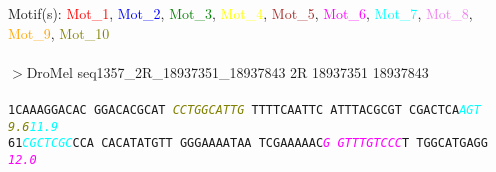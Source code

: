 \documentclass[11pt,twoside,reqno,a4paper]{article}
\begin{document}
\noindent
\newlength{\charwidth}Motif(s): \textcolor{red}{Mot\_1}, \textcolor{blue}{Mot\_2}, \textcolor{green}{Mot\_3}, \textcolor{yellow}{Mot\_4}, \textcolor{brown}{Mot\_5}, \textcolor{magenta}{Mot\_6}, \textcolor{cyan}{Mot\_7}, \textcolor{violet}{Mot\_8}, \textcolor{orange}{Mot\_9}, \textcolor{olive}{Mot\_10}\\
\\
$>$DroMel	seq1357\_2R\_18937351\_18937843	2R	18937351	18937843 \\
 \\
\texttt{1\hspace*{3\charwidth}CAAAGGACAC	GGACACGCAT	\textit{\textcolor{olive}{C}}\textit{\textcolor{olive}{C}}\textit{\textcolor{olive}{T}}\textit{\textcolor{olive}{G}}\textit{\textcolor{olive}{G}}\textit{\textcolor{olive}{C}}\textit{\textcolor{olive}{A}}\textit{\textcolor{olive}{T}}\textit{\textcolor{olive}{T}}\textit{\textcolor{olive}{G}}	TTTTCAATTC	ATTTACGCGT	CGACTCA\textit{\textcolor{cyan}{A}}\textit{\textcolor{cyan}{G}}\textit{\textcolor{cyan}{T}}	\\
\hspace*{4\charwidth}\hspace*{1\charwidth}\hspace*{1\charwidth}\hspace*{20\charwidth}\textit{\textcolor{olive}{9.6}}\hspace*{1\charwidth}\hspace*{1\charwidth}\hspace*{1\charwidth}\hspace*{34\charwidth}\textit{\textcolor{cyan}{11.9}}\hspace*{1\charwidth}\\
61\hspace*{2\charwidth}\textit{\textcolor{cyan}{C}}\textit{\textcolor{cyan}{G}}\textit{\textcolor{cyan}{C}}\textit{\textcolor{cyan}{T}}\textit{\textcolor{cyan}{C}}\textit{\textcolor{cyan}{G}}\textit{\textcolor{cyan}{C}}CCA	CACATATGTT	GGGAAAATAA	TCGAAAAAC\textit{\textcolor{magenta}{G}}	\textit{\textcolor{magenta}{G}}\textit{\textcolor{magenta}{T}}\textit{\textcolor{magenta}{T}}\textit{\textcolor{magenta}{T}}\textit{\textcolor{magenta}{G}}\textit{\textcolor{magenta}{T}}\textit{\textcolor{magenta}{C}}\textit{\textcolor{magenta}{C}}\textit{\textcolor{magenta}{C}}T	TGGCATGAGG	\\
\hspace*{4\charwidth}\hspace*{1\charwidth}\hspace*{1\charwidth}\hspace*{1\charwidth}\hspace*{39\charwidth}\textit{\textcolor{magenta}{12.0}}\hspace*{1\charwidth}\hspace*{1\charwidth}\hspace*{1\charwidth}\\
}
\end{document}
